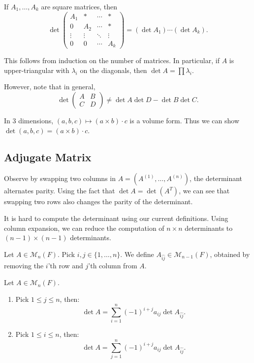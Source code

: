 \documentclass[12pt]{article}
\begin{document}
\begin{corollary}
	If $A_1, \ldots, A_k$ are square matrices, then
	\[
		\det
	\begin{pmatrix}
		A_1 & \ast & \cdots & \ast \\
		0 & A_2 & \cdots & \ast \\
		 \vdots & \vdots& \ddots & \vdots \\
		 0 & 0 & \cdots & A_k
	\end{pmatrix}
	= (\det A_1) \cdots (\det A_k)
	.\]
\end{corollary}
This follows from induction on the number of matrices. In particular, if $A$ is upper-triangular with $\lambda_i$ on the diagonals, then $\det A = \prod \lambda_i$.

However, note that in general,
\[
\det
\begin{pmatrix}
	A & B \\
	C & D
\end{pmatrix}
\neq \det A \det D - \det B \det C
.\]

\begin{remark}
	In 3 dimensions, $(a, b, c) \mapsto (a \times b) \cdot c$ is a volume form. Thus we can show $\det(a, b, c) = (a \times b) \cdot c$.
\end{remark}

\subsection{Adjugate Matrix}%
\label{sub:adjugate_matrix}

Observe by swapping two columns in $A = (A^{(1)}, \ldots, A^{(n)})$, the determinant alternates parity. Using the fact that $\det A = \det (A^{T})$, we can see that swapping two rows also changes the parity of the determinant.

It is hard to compute the determinant using our current definitions. Using column expansion, we can reduce the computation of $n \times n$ determinants to $(n-1) \times (n-1)$ determinants.

\begin{definition}
	Let $A \in \mathcal{M}_n(F)$. Pick $i, j \in \{1, \ldots, n\}$. We define $A_{\widehat{ij}} \in \mathcal{M}_{n-1}(F)$, obtained by removing the $i$'th row and $j$'th column from $A$.
\end{definition}

\begin{lemma}
	Let $A \in \mathcal{M}_n(F)$.
	\begin{enumerate}[\normalfont(i)]
		\item Pick $1 \leq j \leq n$, then:
			\[
				\det A = \sum_{i = 1}^{n}(-1)^{i+j} a_{ij} \det A_{\widehat{ij}}
			.\]
		\item Pick $1 \leq i \leq n$, then:
			\[
				\det A = \sum_{j = 1}^{n} (-1)^{i+j} a_{ij} \det A_{\widehat{ij}}
			.\]
	\end{enumerate}
\end{lemma}
\end{document}
